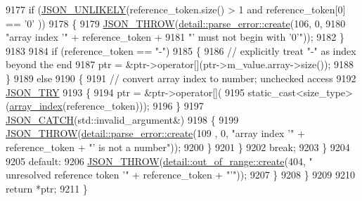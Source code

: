 \begin{DoxyCode}
9177                     \textcolor{keywordflow}{if} (\hyperlink{json_8hpp_ab77582407c64944e7db1ea95ab520253}{JSON\_UNLIKELY}(reference\_token.size() > 1 and reference\_token[0] == \textcolor{charliteral}{'0'}
      ))
9178                     \{
9179                         \hyperlink{json_8hpp_a6c274f6db2e65c1b66c7d41b06ad690f}{JSON\_THROW}(\hyperlink{classnlohmann_1_1detail_1_1parse__error_a9fd60ad6bce80fd99686ad332faefd37}{detail::parse\_error::create}(106, 0,
9180                                                                \textcolor{stringliteral}{"array index '"} + reference\_token +
9181                                                                \textcolor{stringliteral}{"' must not begin with '0'"}));
9182                     \}
9183 
9184                     \textcolor{keywordflow}{if} (reference\_token == \textcolor{stringliteral}{"-"})
9185                     \{
9186                         \textcolor{comment}{// explicitly treat "-" as index beyond the end}
9187                         ptr = &ptr->operator[](ptr->m\_value.array->size());
9188                     \}
9189                     \textcolor{keywordflow}{else}
9190                     \{
9191                         \textcolor{comment}{// convert array index to number; unchecked access}
9192                         \hyperlink{json_8hpp_a985d3b82445302c57257f6432f261fe9}{JSON\_TRY}
9193                         \{
9194                             ptr = &ptr->operator[](
9195                                 \textcolor{keyword}{static\_cast<}size\_type\textcolor{keyword}{>}(\hyperlink{classnlohmann_1_1json__pointer_ac53f5b79dd91da78743c437832f57ce4}{array\_index}(reference\_token)));
9196                         \}
9197                         \hyperlink{json_8hpp_a6954bec49ed2a2dfb938c1131c82740a}{JSON\_CATCH}(std::invalid\_argument&)
9198                         \{
9199                             \hyperlink{json_8hpp_a6c274f6db2e65c1b66c7d41b06ad690f}{JSON\_THROW}(\hyperlink{classnlohmann_1_1detail_1_1parse__error_a9fd60ad6bce80fd99686ad332faefd37}{detail::parse\_error::create}(109
      , 0, \textcolor{stringliteral}{"array index '"} + reference\_token + \textcolor{stringliteral}{"' is not a number"}));
9200                         \}
9201                     \}
9202                     \textcolor{keywordflow}{break};
9203                 \}
9204 
9205                 \textcolor{keywordflow}{default}:
9206                     \hyperlink{json_8hpp_a6c274f6db2e65c1b66c7d41b06ad690f}{JSON\_THROW}(\hyperlink{classnlohmann_1_1detail_1_1out__of__range_a3f6d82a6f967c4728a1ec735a7867073}{detail::out\_of\_range::create}(404, \textcolor{stringliteral}{"
      unresolved reference token '"} + reference\_token + \textcolor{stringliteral}{"'"}));
9207             \}
9208         \}
9209 
9210         \textcolor{keywordflow}{return} *ptr;
9211     \}
\end{DoxyCode}
